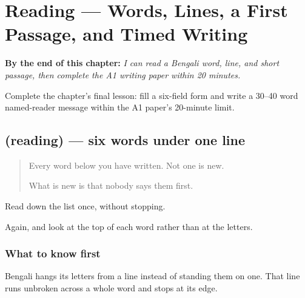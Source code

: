 
\chapter{Reading — Words, Lines, a First Passage, and Timed Writing}
\label{ch:bn-prothom-path}

\begin{chapteropening}
\textbf{By the end of this chapter:} \emph{I can read a Bengali word, line, and short passage, then complete the A1 writing paper within 20 minutes.}

Complete the chapter's final lesson: fill a six-field form and write a 30–40 word named-reader message within the A1 paper's 20-minute limit.
\end{chapteropening}

\section[(reading)]{(reading) — six words under one line}

\label{lesson:BN-C40-words}



\begin{quote}
Every word below you have written. Not one is new.

What is new is that nobody says them first.
\end{quote}

\begin{tcolorbox}[breakable,skin=enhanced,colback=orange!6,colframe=orange!45!black,boxrule=0.5pt,arc=1mm,left=6pt,right=6pt,top=4pt,bottom=4pt,fonttitle=\bfseries,title={Read this}]
\begin{quote}
     
\end{quote}

Read down the list once, without stopping.

Again, and look at the top of each word rather than at the letters.
\end{tcolorbox}

\subsection*{What to know first}
Bengali hangs its letters from a line instead of standing them on one. That line runs unbroken across a whole word and stops at its edge.

